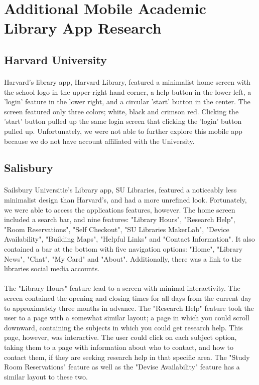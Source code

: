 \section{Additional Mobile Academic Library App Research}
        \subsection{Harvard University}
            \paragraph{}
            Harvard's library app, Harvard Library, featured a minimalist home screen with the school logo in the upper-right hand corner, a help button in the lower-left, a 'login' feature in the lower right, and a circular 'start' button in the center. The screen featured only three colors; white, black and crimson red. Clicking the 'start' button pulled up the same login screen that clicking the 'login' button pulled up.  Unfortunately, we were not able to further explore this mobile app because we do not have account affiliated with the University.
        \subsection{Salisbury}
            \paragraph{}
            Sailsbury Universitie's Library app, SU Libraries, featured a noticeably less minimalist design than Harvard's, and had a more unrefined look.  Fortunately, we were able to access the applications features, however. The home screen included a search bar, and nine features: "Library Hours", "Research Help", "Room Reservations", "Self Checkout", "SU Libraries MakerLab", "Device Availability", "Building Maps", "Helpful Links" and "Contact Information". It also contained a bar at the bottom with five navigation options: "Home", "Library News", "Chat", "My Card" and "About". Additionally, there was a link to the libraries social media accounts.
            \paragraph{}
            The "Library Hours" feature lead to a screen with minimal interactivity. The screen contained the opening and closing times for all days from the current day to approximately three months in advance. The "Research Help" feature took the user to a page with a somewhat similar layout; a page in which you could scroll downward, containing the subjects in which you could get research help. This page, however, was interactive. The user could click on each subject option, taking them to a page with information about who to contact, and how to contact them, if they are seeking research help in that specific area.  The "Study Room Reservations" feature as well as the "Devise Availability" feature has a similar layout to these two.

